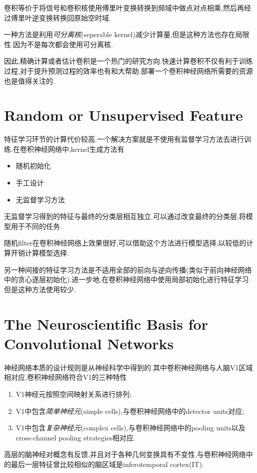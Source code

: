 卷积等价于将信号和卷积核使用傅里叶变换转换到频域中做点对点相乘,然后再经过傅里叶逆变换转换回原始空时域.

一种方法是利用\textit{可分离核}(seperable kernel)减少计算量,但是这种方法也存在局限性.因为不是每次都会使用可分离核.

因此,精确计算或者估计卷积是一个热门的研究方向.快速计算卷积不仅有利于训练过程,对于提升预测过程的效率也有和大帮助.部署一个卷积神经网络所需要的资源也是值得关注的.

\section{Random or Unsupervised Feature}

特征学习环节的计算代价较高.一个解决方案就是不使用有监督学习方法去进行训练.在卷积神经网络中,kernel生成方法有
\begin{itemize}
    \item 随机初始化
    \item 手工设计
    \item 无监督学习方法
\end{itemize}
无监督学习得到的特征与最终的分类层相互独立.可以通过改变最终的分类层,将模型用于不同的任务.

随机filter在卷积神经网络上效果很好,可以借助这个方法进行模型选择,以较低的计算开销计算模型选择.

另一种间接的特征学习方法是不适用全部的前向与逆向传播(类似于前向神经网络中的贪心逐层初始化).进一步地,在卷积神经网络中使用局部初始化进行特征学习.但是这种方法使用较少.

\section{The Neuroscientific Basis for Convolutional Networks}

神经网络本质的设计规则是从神经科学中得到的.其中卷积神经网络与人脑V1区域相对应,卷积神经网络符合V1的三种特性
\begin{enumerate}
    \item V1神经元按照空间映射关系进行排列;
    \item V1中包含\textit{简单神经元}(simple cells),与卷积神经网络中的detector units对应;
    \item V1中包含\textit{复杂神经元}(complex cells),与卷积神经网络中的pooling units以及cross-channel pooling strategies相对应.
\end{enumerate}

高层的脑神经对概念有反馈,并且对于各种几何变换具有不变性.与卷积神经网络中的最后一层特征曾比较相似的脑区域是inferotemporal cortex(IT).

